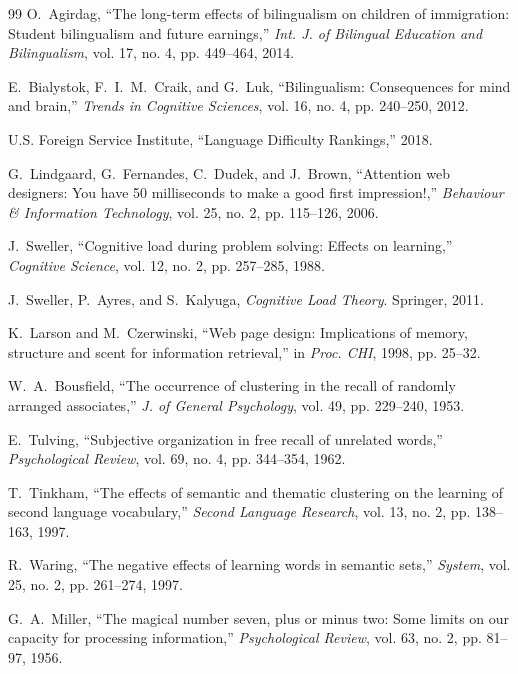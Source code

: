 \documentclass[11pt,a4paper]{article}
\begin{document}
\begin{thebibliography}{99}
O.~Agirdag, ``The long-term effects of bilingualism on children of immigration: Student bilingualism and future earnings,'' \emph{Int. J. of Bilingual Education and Bilingualism}, vol. 17, no. 4, pp. 449--464, 2014.

E.~Bialystok, F.~I.~M.~Craik, and G.~Luk, ``Bilingualism: Consequences for mind and brain,'' \emph{Trends in Cognitive Sciences}, vol. 16, no. 4, pp. 240--250, 2012.

U.S. Foreign Service Institute, ``Language Difficulty Rankings,'' 2018.

G.~Lindgaard, G.~Fernandes, C.~Dudek, and J.~Brown, ``Attention web designers: You have 50 milliseconds to make a good first impression!,'' \emph{Behaviour \& Information Technology}, vol. 25, no. 2, pp. 115--126, 2006.

J.~Sweller, ``Cognitive load during problem solving: Effects on learning,'' \emph{Cognitive Science}, vol. 12, no. 2, pp. 257--285, 1988.

J.~Sweller, P.~Ayres, and S.~Kalyuga, \emph{Cognitive Load Theory}. Springer, 2011.

K.~Larson and M.~Czerwinski, ``Web page design: Implications of memory, structure and scent for information retrieval,'' in \emph{Proc. CHI}, 1998, pp. 25--32.

W.~A.~Bousfield, ``The occurrence of clustering in the recall of randomly arranged associates,'' \emph{J. of General Psychology}, vol. 49, pp. 229--240, 1953.

E.~Tulving, ``Subjective organization in free recall of unrelated words,'' \emph{Psychological Review}, vol. 69, no. 4, pp. 344--354, 1962.

T.~Tinkham, ``The effects of semantic and thematic clustering on the learning of second language vocabulary,'' \emph{Second Language Research}, vol. 13, no. 2, pp. 138--163, 1997.

R.~Waring, ``The negative effects of learning words in semantic sets,'' \emph{System}, vol. 25, no. 2, pp. 261--274, 1997.

G.~A.~Miller, ``The magical number seven, plus or minus two: Some limits on our capacity for processing information,'' \emph{Psychological Review}, vol. 63, no. 2, pp. 81--97, 1956.


\end{thebibliography}
\end{document}
